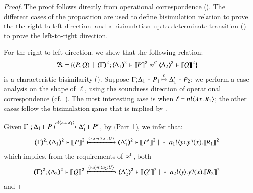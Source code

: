 \begin{proof}

%
	The proof follows directly from operational correspondence ().
	The different cases of the proposition are used to define
	bisimulation relation to prove the the right-to-left direction, and
	a bisimulation up-to determinate transition
	()
	to prove the
	left-to-right direction.

\bigskip

	\noi For the right-to-left direction, we show that the following relation:
	\[
		\Re = \set{
		(P,Q)
		\setbar \horel{\tmap{\Gamma}{2}}{\tmap{\Delta_1}{2}}{\pmap{P}{2}}{\fwb}{\tmap{\Delta_2}{2}}{\pmap{Q}{2}}}
	\]
%
is a characteristic bisimilarity ().
%
Suppose $\Gamma; \Delta_1 \vdash P_1 \xmapsto{\ell} \Delta_1' \vdash P_2$; 
we perform a case analysis on the shape of ${\ell}$, using 
the soundness direction of operational correspondence (cf.~).
		The  most interesting case is when $\ell = n ! \langle \lambda x.\,R_1 \rangle$; the other cases follow
	the bisimulation game that is implied by .

	\noi Given $\Gamma_1; \Delta_1 \vdash P \xmapsto{n !\langle \lambda x.\,R_1 \rangle} \Delta_1' \vdash P'$, by 
 (Part 1), we  infer that:
%
	\begin{eqnarray*}
		\tmap{\Gamma}{2}; \tmap{\Delta_1}{2} \proves \pmap{P}{2} \hby{\news{a} \bactout{n}{a_1: U}} \tmap{\Delta_1'}{2} \proves \pmap{P'}{2} \Par \repl{\bout{a_1}{y} \binp{y}{x} \pmap{R_1}{2}}
	\end{eqnarray*}
%
	which implies, from the requirements of $\approx^\mathtt{C}$, both 
%
	\begin{eqnarray}
		\label{prop:fa_ho_sessp_1}
		\tmap{\Gamma}{2}; \tmap{\Delta_2}{2} \proves \pmap{Q}{2} \Hby{\news{a} \bactout{n}{a_2: U}} \tmap{\Delta_2'}{2} \proves \pmap{Q'}{2} \Par \repl{\bout{a_2}{y} \binp{y}{x} \pmap{R_2}{2}}
	\end{eqnarray}
%
	and


\end{proof}
